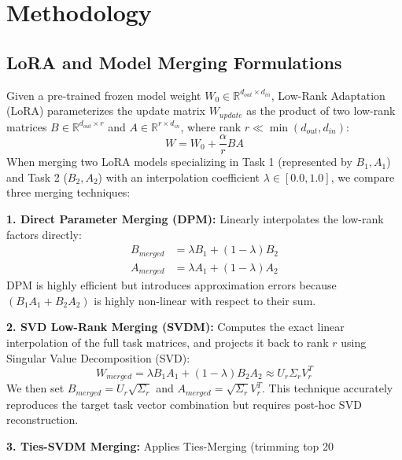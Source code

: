 \documentclass{article}
\begin{document}
\section{Methodology}
\label{submission-methodology}

\subsection{LoRA and Model Merging Formulations}
Given a pre-trained frozen model weight $W_0 \in \mathbb{R}^{d_{out} \times d_{in}}$, Low-Rank Adaptation (LoRA) parameterizes the update matrix $W_{update}$ as the product of two low-rank matrices $B \in \mathbb{R}^{d_{out} \times r}$ and $A \in \mathbb{R}^{r \times d_{in}}$, where rank $r \ll \min(d_{out}, d_{in})$:
\begin{equation}
    W = W_0 + \frac{\alpha}{r} B A
\end{equation}
When merging two LoRA models specializing in Task 1 (represented by $B_1, A_1$) and Task 2 ($B_2, A_2$) with an interpolation coefficient $\lambda \in [0.0, 1.0]$, we compare three merging techniques:

\textbf{1. Direct Parameter Merging (DPM):}
Linearly interpolates the low-rank factors directly:
\begin{align}
    B_{merged} &= \lambda B_1 + (1-\lambda) B_2 \\
    A_{merged} &= \lambda A_1 + (1-\lambda) A_2
\end{align}
DPM is highly efficient but introduces approximation errors because $(B_1 A_1 + B_2 A_2)$ is highly non-linear with respect to their sum.

\textbf{2. SVD Low-Rank Merging (SVDM):}
Computes the exact linear interpolation of the full task matrices, and projects it back to rank $r$ using Singular Value Decomposition (SVD):
\begin{equation}
    W_{merged} = \lambda B_1 A_1 + (1-\lambda) B_2 A_2 \approx U_r \Sigma_r V_r^T
\end{equation}
We then set $B_{merged} = U_r \sqrt{\Sigma_r}$ and $A_{merged} = \sqrt{\Sigma_r} V_r^T$. This technique accurately reproduces the target task vector combination but requires post-hoc SVD reconstruction.

\textbf{3. Ties-SVDM Merging:}
Applies Ties-Merging \cite{yadav2023ties} (trimming top 20%
\end{document}
